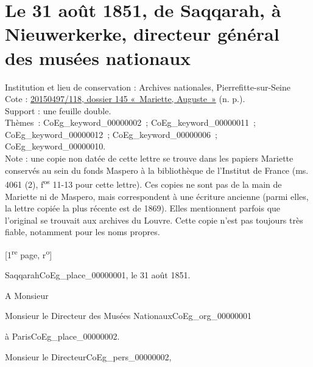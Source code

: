 \documentclass{book}
\begin{document}
\section*{Le 31 août 1851, de Saqqarah, à Nieuwerkerke, directeur général des musées nationaux}
{\footnotesize
\noindent Institution et lieu de conservation : Archives nationales, Pierrefitte-sur-Seine\\
Cote : \hyperlink{CoEg_Mariette_ms_001}{20150497/118, dossier 145 «~Mariette, Auguste~»} (n. p.).\\
Support : une feuille double.\\
Thèmes~: \gls{CoEg_keyword_00000002}~; \gls{CoEg_keyword_00000011}~; \gls{CoEg_keyword_00000012}~; \gls{CoEg_keyword_00000006}~; \gls{CoEg_keyword_00000010}.\\
Note : une copie non datée de cette lettre se trouve dans les papiers Mariette conservés au sein du fonds Maspero à la bibliothèque de l’Institut de France (ms. 4061 (2), f\textsuperscript{os} 11-13 pour cette lettre). Ces copies ne sont pas de la main de Mariette ni de Maspero, mais correspondent à une écriture ancienne (parmi elles, la lettre copiée la plus récente est de 1869). Elles mentionnent parfois que l’original se trouvait aux archives du Louvre. Cette copie n’est pas toujours très fiable, notamment pour les noms propres.
\begin{center} {[1\textsuperscript{re} page, r\textsuperscript{o}]}\end{center}}
\begin{flushright}Saqqarah\gls{CoEg_place_00000001}, le 31 août 1851.\end{flushright}
A Monsieur
\begin{center}Monsieur le Directeur des Musées Nationaux\gls{CoEg_org_00000001}\end{center}
\begin{flushright}à Paris\gls{CoEg_place_00000002}.\end{flushright}

\indent \hspace{1cm}Monsieur le Directeur\gls{CoEg_pers_00000002},\\
\end{document}
